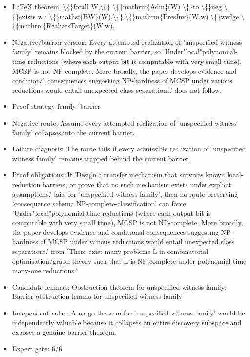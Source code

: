 \documentclass[11pt]{article}
\begin{document}
\begin{itemize}
\item LaTeX theorem: \textbackslash\{\}forall W,\textbackslash\{\} \textbackslash\{\}mathrm\{Adm\}(W) \textbackslash\{\}to \textbackslash\{\}neg \textbackslash\{\}exists w : \textbackslash\{\}mathsf\{BW\}(W),\textbackslash\{\} \textbackslash\{\}mathrm\{PresInv\}(W,w) \textbackslash\{\}wedge \textbackslash\{\}mathrm\{RealizesTarget\}(W,w).
\item Negative/barrier version: Every attempted realization of 'unspecified witness family' remains blocked by the current barrier, so 'Under"local"polynomial-time reductions (where each output bit is computable with very small time), MCSP is not NP-complete. More broadly, the paper develops evidence and conditional consequences suggesting NP-hardness of MCSP under various reductions would entail unexpected class separations.' does not follow.
\item Proof strategy family: barrier
\item Negative route: Assume every attempted realization of 'unspecified witness family' collapses into the current barrier.
\item Failure diagnosis: The route fails if every admissible realization of 'unspecified witness family' remains trapped behind the current barrier.
\item Proof obligations: If 'Design a transfer mechanism that survives known local-reduction barriers, or prove that no such mechanism exists under explicit assumptions.' fails for 'unspecified witness family', then no route preserving 'consequence schema NP-complete-classification' can force 'Under"local"polynomial-time reductions (where each output bit is computable with very small time), MCSP is not NP-complete. More broadly, the paper develops evidence and conditional consequences suggesting NP-hardness of MCSP under various reductions would entail unexpected class separations.' from 'There exist many problems L in combinatorial optimisation/graph theory such that L is NP-complete under polynomial-time many-one reductions.'.
\item Candidate lemmas: Obstruction theorem for unspecified witness family; Barrier obstruction lemma for unspecified witness family
\item Independent value: A no-go theorem for 'unspecified witness family' would be independently valuable because it collapses an entire discovery subspace and exposes a genuine barrier theorem.
\item Expert gate: 6/6
\end{itemize}
\end{document}
